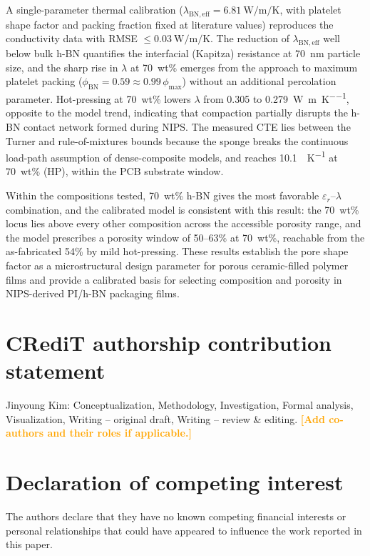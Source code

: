 \documentclass[preprint,a4paper]{elsarticle}
\newcommand{\eps}{\ensuremath{\varepsilon_r}}   %
\newcommand{\lam}{\ensuremath{\lambda}}
\newcommand{\phimax}{\ensuremath{\phi_{\max}}}
\newcommand{\phiBN}{\ensuremath{\phi_{\mathrm{BN}}}}
\newcommand{\lamBN}{\ensuremath{\lambda_{\mathrm{BN,eff}}}}
\newcommand{\hl}[1]{\textcolor{orange}{\textbf{[#1]}}}
\begin{document}
A single-parameter thermal calibration ($\lamBN = \SI{6.81}{\watt\per\meter\per\kelvin}$, with platelet shape factor and packing fraction fixed at literature values) reproduces the conductivity data with RMSE $\le \SI{0.03}{\watt\per\meter\per\kelvin}$. The reduction of \lamBN{} well below bulk h-BN quantifies the interfacial (Kapitza) resistance at \SI{70}{\nm} particle size, and the sharp rise in \lam{} at 70~wt\% emerges from the approach to maximum platelet packing ($\phiBN = 0.59 \approx 0.99\,\phimax$) without an additional percolation parameter. Hot-pressing at 70~wt\% lowers \lam{} from 0.305 to \SI{0.279}{\watt\per\meter\per\kelvin}, opposite to the model trend, indicating that compaction partially disrupts the h-BN contact network formed during NIPS. The measured CTE lies between the Turner and rule-of-mixtures bounds because the sponge breaks the continuous load-path assumption of dense-composite models, and reaches \SI{10.1}{\ppm\per\kelvin} at 70~wt\% (HP), within the PCB substrate window.

Within the compositions tested, 70~wt\% h-BN gives the most favorable \eps--\lam{} combination, and the calibrated model is consistent with this result: the 70~wt\% locus lies above every other composition across the accessible porosity range, and the model prescribes a porosity window of 50--63\% at 70~wt\%, reachable from the as-fabricated 54\% by mild hot-pressing. These results establish the pore shape factor as a microstructural design parameter for porous ceramic-filled polymer films and provide a calibrated basis for selecting composition and porosity in NIPS-derived PI/h-BN packaging films.

\section*{CRediT authorship contribution statement}
Jinyoung Kim: Conceptualization, Methodology, Investigation, Formal analysis, Visualization, Writing -- original draft, Writing -- review \& editing. \hl{Add co-authors and their roles if applicable.}

\section*{Declaration of competing interest}
The authors declare that they have no known competing financial interests or personal relationships that could have appeared to influence the work reported in this paper.
\end{document}
